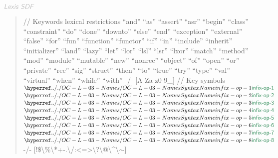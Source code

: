 $\KEY{Lexis SDF}$

\begin{quote}
// Keywords\newline
   \newline
   lexical restrictions\newline
   \newline
         ``and''          ``as''         ``assert''   ``asr''       ``begin''     ``class''\newline
         ``constraint''   ``do''         ``done''     ``downto''    ``else''      ``end''\newline
         ``exception''    ``external''   ``false''    ``for''       ``fun''       ``function''\newline
         ``functor''      ``if''         ``in''       ``include''   ``inherit''   ``initializer''\newline
         ``land''         ``lazy''       ``let''      ``lor''       ``lsl''       ``lsr''\newline
         ``lxor''         ``match''      ``method''   ``mod''       ``module''    ``mutable'' \newline
         ``new''          ``nonrec''     ``object''   ``of''        ``open''      ``or''     \newline
         ``private''      ``rec''        ``sig''      ``struct''    ``then''      ``to''\newline
         ``true''         ``try''        ``type''     ``val''       ``virtual''   ``when'' \newline
         ``while''        ``with''\newline
     -/- {[}A-Za-z0-9\_{]} \newline
   \newline
   // Key symbols\newline
   \newline
   $\SHADE{\SYNHYPER{../.}{OC-L-03-Names}{infix-op-1}}$ $\SHADE{\SYNHYPER{../.}{OC-L-03-Names}{infix-op-2}}$ $\SHADE{\SYNHYPER{../.}{OC-L-03-Names}{infix-op-3}}$ $\SHADE{\SYNHYPER{../.}{OC-L-03-Names}{infix-op-4}}$ \newline
   $\SHADE{\SYNHYPER{../.}{OC-L-03-Names}{infix-op-5}}$ $\SHADE{\SYNHYPER{../.}{OC-L-03-Names}{infix-op-6}}$ $\SHADE{\SYNHYPER{../.}{OC-L-03-Names}{infix-op-7}}$ $\SHADE{\SYNHYPER{../.}{OC-L-03-Names}{infix-op-8}}$ \newline
          -/- {[}!\$\textbackslash{}\%\textbackslash{}*+-.\textbackslash{}/:\textless{}=\textgreater{}\textbackslash{}?\textbackslash{}@\textbackslash{}\^{}\textbar{}\textbackslash{}\ensuremath{\sim}{]}\newline

\end{quote}
